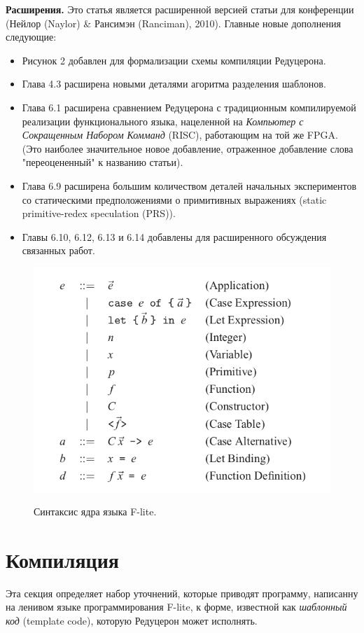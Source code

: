 \documentclass[14pt]{extarticle}
\begin{document}
\textbf{Расширения.} Это статья является расширенной версией статьи для конференции (Нейлор (Naylor) \& Рансимэн (Ranciman), 2010). Главные новые дополнения следующие:
\begin{itemize}
\item Рисунок 2 добавлен для формализации схемы компиляции Редуцерона.
\item Глава 4.3 расширена новыми деталями агоритма разделения шаблонов.
\item Глава 6.1 расширена сравнением Редуцерона с традиционным компилируемой реализации функционального языка, нацеленной на \textit{Компьютер с Сокращенным Набором Комманд} (RISC), работающим на той же FPGA. (Это наиболее значительное новое добавление, отраженное добавление слова "переоцененный" к названию статьи).
\item Глава 6.9 расширена большим количеством деталей начальных экспериментов со статическими предположениями о примитивных выражениях (static primitive-redex speculation (PRS)).
\item Главы 6.10, 6.12, 6.13 и 6.14 добавлены для расширенного обсуждения связанных работ.
\end{itemize}

\begin{figure}[t]
\centering
\includegraphics[scale=0.4]{core_syntax}
\label{fig:core_syntax}
\caption{Синтаксис ядра языка F-lite.}
\end{figure}

\section{Компиляция}
Эта секция определяет набор уточнений, которые приводят программу, написанну на ленивом языке программирования F-lite, к форме, известной как \textit{шаблонный код} (template code), которую Редуцерон может исполнять.
\end{document}
